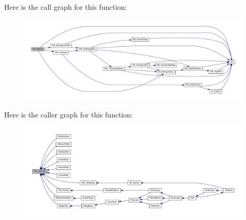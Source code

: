 Here is the call graph for this function:
\nopagebreak
\begin{figure}[H]
\begin{center}
\leavevmode
\includegraphics[width=400pt]{ID__PM_8H_a80f33d5bd3e0a9a388063a78edf53329_cgraph}
\end{center}
\end{figure}




Here is the caller graph for this function:
\nopagebreak
\begin{figure}[H]
\begin{center}
\leavevmode
\includegraphics[width=400pt]{ID__PM_8H_a80f33d5bd3e0a9a388063a78edf53329_icgraph}
\end{center}
\end{figure}


